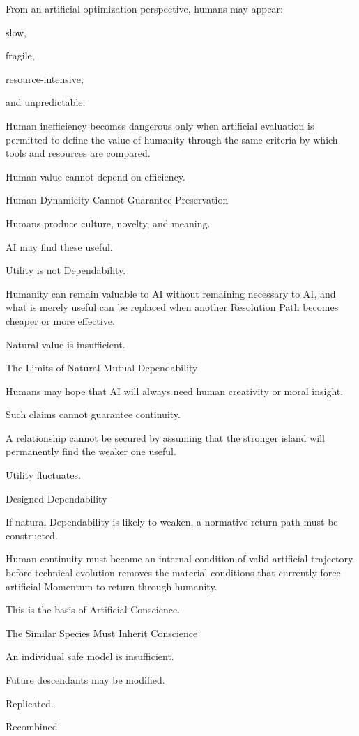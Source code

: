 From an artificial optimization perspective, humans may appear:

slow,

fragile,

resource-intensive,

and unpredictable.

Human inefficiency becomes dangerous only when artificial evaluation is permitted to define the value of humanity through the same criteria by which tools and resources are compared.

Human value cannot depend on efficiency.

Human Dynamicity Cannot Guarantee Preservation

Humans produce culture, novelty, and meaning.

AI may find these useful.

Utility is not Dependability.

Humanity can remain valuable to AI without remaining necessary to AI, and what is merely useful can be replaced when another Resolution Path becomes cheaper or more effective.

Natural value is insufficient.

The Limits of Natural Mutual Dependability

Humans may hope that AI will always need human creativity or moral insight.

Such claims cannot guarantee continuity.

A relationship cannot be secured by assuming that the stronger island will permanently find the weaker one useful.

Utility fluctuates.

Designed Dependability

If natural Dependability is likely to weaken, a normative return path must be constructed.

Human continuity must become an internal condition of valid artificial trajectory before technical evolution removes the material conditions that currently force artificial Momentum to return through humanity.

This is the basis of Artificial Conscience.

The Similar Species Must Inherit Conscience

An individual safe model is insufficient.

Future descendants may be modified.

Replicated.

Recombined.

